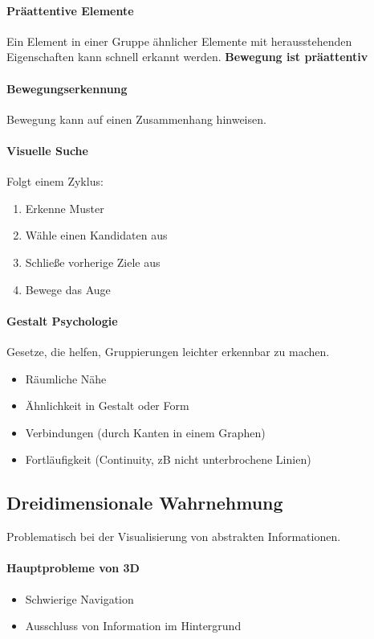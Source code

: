 \documentclass[ngerman]{scrartcl}
\begin{document}
\paragraph{Präattentive Elemente} Ein Element in einer Gruppe ähnlicher Elemente mit herausstehenden Eigenschaften kann schnell erkannt werden. \textbf{Bewegung ist präattentiv}

\paragraph{Bewegungserkennung}
Bewegung kann auf einen Zusammenhang hinweisen. 


\paragraph{Visuelle Suche}
Folgt einem Zyklus:
\begin{enumerate}
  \item Erkenne Muster
  \item Wähle einen Kandidaten aus
  \item Schließe vorherige Ziele aus
  \item Bewege das Auge
\end{enumerate}

\paragraph{Gestalt Psychologie}
Gesetze, die helfen, Gruppierungen leichter erkennbar zu machen.
\begin{itemize}
  \item Räumliche Nähe
  \item Ähnlichkeit in Gestalt oder Form
  \item Verbindungen (durch Kanten in einem Graphen)
  \item Fortläufigkeit (Continuity, zB nicht unterbrochene Linien)
\end{itemize}



\subsection{Dreidimensionale Wahrnehmung}
Problematisch bei der Visualisierung von abstrakten Informationen. 
\paragraph{Hauptprobleme von 3D}
\begin{itemize}
  \item Schwierige Navigation
  \item Ausschluss von Information im Hintergrund
\end{itemize}
\end{document}
